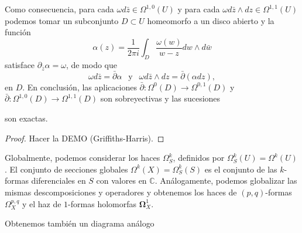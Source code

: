 \documentclass[12pt,a4paper]{article}
\theoremstyle{definition} \newtheorem{defn}[thm]{Definición}
\theoremstyle{definition} \newtheorem{ejemplo}[thm]{Ejemplo}
\theoremstyle{definition} \newtheorem{ejercicio}[thm]{Ejercicio}
\def\CC{\mathbb{C}}
\def\OO{\mathscr{O}}
\def\delbar{\bar{\partial}}
\begin{document}
Como consecuencia, para cada $\omega d\bar{z} \in \Omega^{1,0}(U)$ y para cada $\omega d\bar{z}\wedge dz \in \Omega^{1,1}(U)$ podemos tomar un subconjunto  $D \subset U$ homeomorfo a un disco abierto y la función \begin{equation*}    \alpha(z) = \frac{1}{2\pi i}\int_D \frac{\omega(w)}{w-z} dw \wedge d\bar{w}  \end{equation*}  satisface $\partial_{\bar{z}} \alpha = \omega$, de modo que \begin{equation*}  \omega d\bar{z} = \delbar{\alpha} \ \ \text{ y } \ \   \omega d\bar{z}\wedge dz = \bar{\partial}(\alpha dz),  \end{equation*} en $D$. En conclusión, las aplicaciones $\delbar:\Omega^0(D)\rightarrow \Omega^{0,1}(D)$ y $\bar{\partial}:\Omega^{1,0}(D) \rightarrow \Omega^{1,1}(D)$ son sobreyectivas y las sucesiones  \begin{center}      \end{center}  son exactas.

\begin{proof}
  Hacer la DEMO (Griffiths-Harris).
\end{proof}

Globalmente, podemos considerar los haces $\Omega^k_S$, definidos por $\Omega^k_S(U)=\Omega^k(U)$. El conjunto de secciones globales $\Omega^k(X)=\Omega^k_S(S)$ es el conjunto de las $k$-formas diferenciales en $S$ con valores en $\CC$. Análogamente, podemos globalizar las mismas descomposiciones y operadores y obtenemos los haces de $(p,q)$-formas $\Omega^{p,q}_X$ y el haz de $1$-formas holomorfas $\boldsymbol{\Omega}^1_X$.

Obtenemos también un diagrama análogo

\begin{center}	        \end{center}
\end{document}
